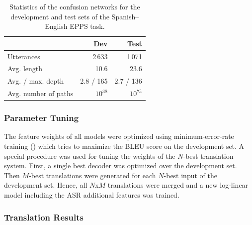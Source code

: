 \documentclass[10pt]{report}
\theoremstyle{plain}
\begin{document}
{\begin{table}[t]	
	\caption{Statistics of the confusion networks for the development and test sets of the Spanish--English EPPS task.}\label{tbl:epps-cn}
	\begin{center}
	\begin{tabular}{|l|r|r|}
	\hline
	& Dev & Test \\
	\hline
	Utterances & 2\,633  & 1\,071 \\
	Avg. length & 10.6 &  23.6 \\
	Avg. / max.  depth & 2.8  / 165 & 2.7 / 136  \\
	Avg. number of paths & $10^{38}$ & $10^{75}$ \\
	\hline
	\end{tabular}
	\end{center}
\end{table}


\subsubsection{Parameter Tuning}
The feature  weights of all models were optimized using minimum-error-rate training (\cite{och:03}) which tries to maximize the BLEU score on the development set.  
A special procedure was used for tuning the weights of the $N$-best translation system. 
First, a single best decoder was optimized over the development set. 
Then $M$-best translations were generated for each $N$-best input of the development set. 
Hence, all $N$x$M$ translations were merged and a new log-linear model  including the ASR additional features was trained. 


\subsubsection{Translation Results}

}
\end{document}
